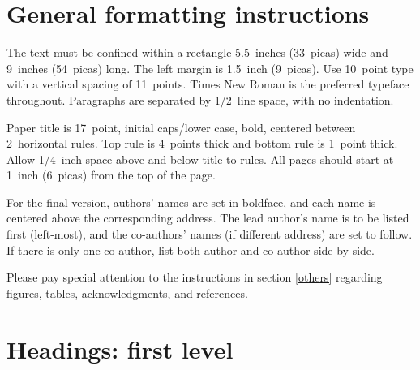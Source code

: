 \documentclass{article} %
\begin{document}


\section{General formatting instructions}
\label{gen_inst}

	The text must be confined within a rectangle 5.5~inches (33~picas) wide and
9~inches (54~picas) long. The left margin is 1.5~inch (9~picas).
Use 10~point type with a vertical spacing of 11~points. Times New Roman is the
preferred typeface throughout. Paragraphs are separated by 1/2~line space,
with no indentation.

Paper title is 17~point, initial caps/lower case, bold, centered between
2~horizontal rules. Top rule is 4~points thick and bottom rule is 1~point
thick. Allow 1/4~inch space above and below title to rules. All pages should
start at 1~inch (6~picas) from the top of the page.


For the final version, authors' names are
set in boldface, and each name is centered above the corresponding
address. The lead author's name is to be listed first (left-most), and
the co-authors' names (if different address) are set to follow. If
there is only one co-author, list both author and co-author side by side.

Please pay special attention to the instructions in section \ref{others}
regarding figures, tables, acknowledgments, and references.

\section{Headings: first level}
\label{headings}
\end{document}
